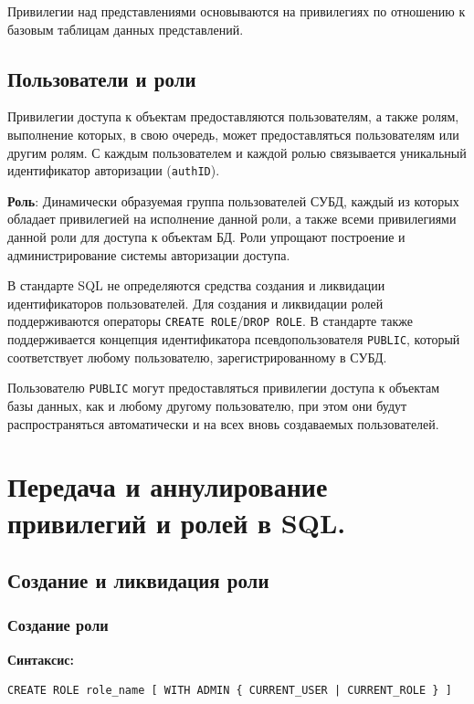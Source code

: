 \documentclass[a4paper,12pt]{article}
\begin{document}
Привилегии над представлениями основываются на привилегиях по отношению к базовым таблицам данных представлений.

\subsection{Пользователи и роли}

Привилегии доступа к объектам предоставляются пользователям, а также ролям, выполнение которых, в свою очередь, может предоставляться пользователям или другим ролям. С каждым пользователем и каждой ролью связывается уникальный идентификатор авторизации (\texttt{authID}).

\textbf{Роль}: Динамически образуемая группа пользователей СУБД, каждый из которых обладает привилегией на исполнение данной роли, а также всеми привилегиями данной роли для доступа к объектам БД. Роли упрощают построение и администрирование системы авторизации доступа.

В стандарте SQL не определяются средства создания и ликвидации идентификаторов пользователей. Для создания и ликвидации ролей поддерживаются операторы \texttt{CREATE ROLE}/\texttt{DROP ROLE}. В стандарте также поддерживается концепция идентификатора псевдопользователя \texttt{PUBLIC}, который соответствует любому пользователю, зарегистрированному в СУБД.

Пользователю \texttt{PUBLIC} могут предоставляться привилегии доступа к объектам базы данных, как и любому другому пользователю, при этом они будут распространяться автоматически и на всех вновь создаваемых пользователей.


\section{Передача и аннулирование привилегий и ролей в SQL.}
\subsection{Создание и ликвидация роли}

\subsubsection{Создание роли}

\textbf{Синтаксис:}
\begin{verbatim}
CREATE ROLE role_name [ WITH ADMIN { CURRENT_USER | CURRENT_ROLE } ]
\end{verbatim}
\end{document}
